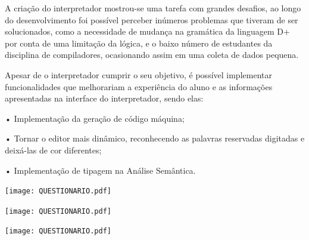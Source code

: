 \documentclass[12pt,oneside,a4paper,chapter=TITLE,section=TITLE,sumario=tradicional]{abntex2}
\begin{document}
A criação do interpretador mostrou-se uma tarefa com grandes desafios, ao longo do desenvolvimento foi possível perceber inúmeros problemas que tiveram de ser solucionados, como a necessidade de mudança na gramática da linguagem D+ por conta de uma limitação da lógica, e o baixo número de estudantes da disciplina de compiladores, ocasionando assim em uma coleta de dados pequena.

Apesar de o interpretador cumprir o seu objetivo, é possível implementar funcionalidades que melhorariam a experiência do aluno e as informações apresentadas na interface do interpretador, sendo elas:


•	Implementação da geração de código máquina;

•	Tornar o editor mais dinâmico, reconhecendo as palavras reservadas digitadas e deixá-las de cor diferentes;

•	Implementação de tipagem na Análise Semântica.





\texttt{[image: QUESTIONARIO.pdf]}

\texttt{[image: QUESTIONARIO.pdf]}

\texttt{[image: QUESTIONARIO.pdf]}

\begin{figure}[htb]
\end{figure}


\begin{figure}[htb]
\end{figure}
\end{document}
